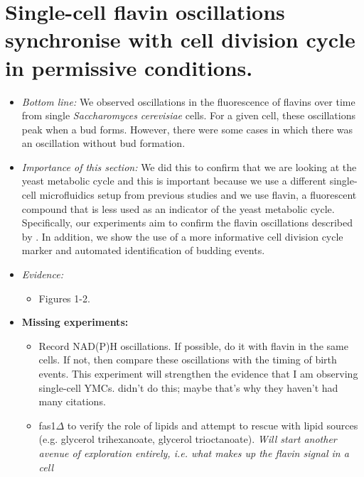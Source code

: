 \section[Permissive conditions]{Single-cell flavin oscillations synchronise with cell division cycle in permissive conditions.}
\label{sec:biology-sync}

\begin{itemize}
\item \emph{Bottom line:} We observed oscillations in the fluorescence of flavins over time from single \textit{Saccharomyces cerevisiae} cells.  For a given cell, these oscillations peak when a bud forms.  However, there were some cases in which there was an oscillation without bud formation.
\item \emph{Importance of this section:} We did this to confirm that we are looking at the yeast metabolic cycle and this is important because we use a different single-cell microfluidics setup from previous studies and we use flavin, a fluorescent compound that is less used as an indicator of the yeast metabolic cycle.  Specifically, our experiments aim to confirm the flavin oscillations described by \textcite{baumgartnerFlavinbasedMetabolicCycles2018}.  In addition, we show the use of a more informative cell division cycle marker and automated identification of budding events.
\item \emph{Evidence:}
\begin{itemize}
\item Figures 1-2.
\end{itemize}

\item \textbf{Missing experiments:}
\begin{itemize}
\item Record NAD(P)H oscillations.  If possible, do it with flavin in the same cells.  If not, then compare these oscillations with the timing of birth events.  This experiment will strengthen the evidence that I am observing single-cell YMCs.  \textcite{baumgartnerFlavinbasedMetabolicCycles2018} didn't do this; maybe that's why they haven't had many citations.
\item fas1$\Delta$ to verify the role of lipids and attempt to rescue with lipid sources (e.g. glycerol trihexanoate, glycerol trioctanoate). \emph{Will start another avenue of exploration entirely, i.e. what makes up the flavin signal in a cell}
\end{itemize}
\end{itemize}

